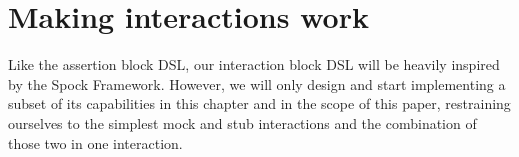 \chapter{Making interactions work}\label{chap:Interaction}
Like the assertion block DSL, our interaction block DSL
will be heavily inspired by the Spock Framework.
However, we will only design and start implementing a subset of
its capabilities in this chapter and in the scope of this paper,
restraining ourselves to the simplest mock and stub interactions
and the combination of those two in one interaction.










